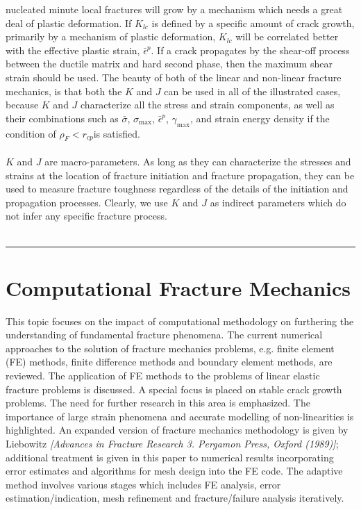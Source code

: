 \documentclass[12pt]{article}
\begin{document}
nucleated minute local fractures will grow by a mechanism which needs a great deal of plastic
deformation. If $K_{lc}$ is defined by a specific amount of crack growth, primarily by a mechanism of plastic
deformation, $K_{lc}$ will be correlated better with the effective plastic strain, $\bar{\epsilon} ^ p$. If a crack propagates by
the shear-off process between the ductile matrix and hard second phase, then the maximum shear strain
should be used. The beauty of both of the linear and non-linear fracture mechanics, is that both the $K$
and $J$ can be used in all of the illustrated cases, because $K$ and $J$ characterize all the stress and strain
components, as well as their combinations such as $\bar{\sigma}$, $\sigma_{\text{max}}$, $\bar{\epsilon} ^ p$, $\gamma_{\text{max}}$, and strain energy density if the
condition of $\rho_F < r_{cp}$is satisfied.
\\\\
$K$ and $J$ are macro-parameters. As long as they can characterize the stresses and strains at the
location of fracture initiation and fracture propagation, they can be used to measure fracture toughness
regardless of the details of the initiation and propagation processes. Clearly, we use $K$ and $J$ as indirect
parameters which do not infer any specific fracture process.
\\\\\rule{\textwidth}{.1em}



\section{Computational Fracture Mechanics}
This topic focuses on the impact of computational methodology on furthering the understanding of fundamental fracture phenomena. The current numerical approaches to the solution of fracture
mechanics problems, e.g. finite element (FE) methods, finite difference methods and boundary element
methods, are reviewed. The application of FE methods to the problems of linear elastic fracture problems
is discussed. A special focus is placed on stable crack growth problems. The need for further research in this
area is emphasized. The importance of large strain phenomena and accurate modelling of non-linearities
is highlighted. An expanded version of fracture mechanics methodology is given by Liebowitz \textit{[Advances  in Fracture Research 3. Pergamon Press, Oxford (1989)]}; additional treatment is given in this paper to
numerical results incorporating error estimates and algorithms for mesh design into the FE code. The
adaptive method involves various stages which includes FE analysis, error estimation/indication, mesh
refinement and fracture/failure analysis iteratively.
\end{document}
